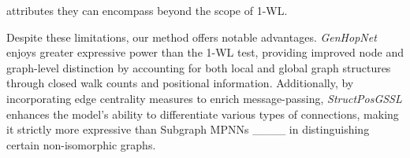 attributes they can encompass beyond the scope of 1-WL. 

Despite these limitations, our method offers notable advantages. \emph{GenHopNet} enjoys greater expressive power than the 1-WL test, providing improved node and graph-level distinction by accounting for both local and global graph structures through closed walk counts and positional information. Additionally, by incorporating edge centrality measures to enrich message-passing, \emph{StructPosGSSL} enhances the model's ability to differentiate various types of connections, making it strictly more expressive than Subgraph MPNNs ____ in distinguishing certain non-isomorphic graphs.

